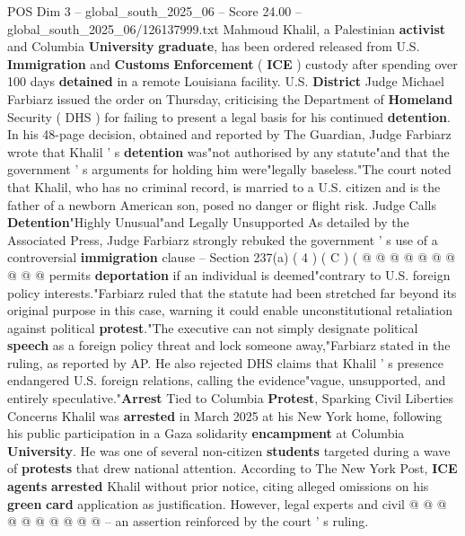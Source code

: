 \begin{textsample}{POS Dim 3 – global\_south\_2025\_06 – Score 24.00 – global\_south\_2025\_06/126137999.txt}  \label{ex:f3_pos_190}
Mahmoud Khalil, a Palestinian \textbf{activist} and Columbia \textbf{University} \textbf{graduate}, has been ordered released from U.S. \textbf{Immigration} and \textbf{Customs} \textbf{Enforcement} ( \textbf{ICE} ) custody after spending over 100 days \textbf{detained} in a remote Louisiana facility.
U.S. \textbf{District} Judge Michael Farbiarz issued the order on Thursday, criticising the Department of \textbf{Homeland} Security ( DHS ) for failing to present a legal basis for his continued \textbf{detention}.
In his 48-page decision, obtained and reported by The Guardian, Judge Farbiarz wrote that Khalil ' s \textbf{detention} was"not authorised by any statute"and that the government ' s arguments for holding him were"legally baseless."The court noted that Khalil, who has no criminal record, is married to a U.S. citizen and is the father of a newborn American son, posed no danger or flight risk.
Judge Calls \textbf{Detention}"Highly Unusual"and Legally Unsupported As detailed by the Associated Press, Judge Farbiarz strongly rebuked the government ' s use of a controversial \textbf{immigration} clause -- Section 237(a) ( 4 ) ( C ) ( @ @ @ @ @ @ @ @ @ @ permits \textbf{deportation} if an individual is deemed"contrary to U.S. foreign policy interests."Farbiarz ruled that the statute had been stretched far beyond its original purpose in this case, warning it could enable unconstitutional retaliation against political \textbf{protest}."The executive can not simply designate political \textbf{speech} as a foreign policy threat and lock someone away,"Farbiarz stated in the ruling, as reported by AP.
He also rejected DHS claims that Khalil ' s presence endangered U.S. foreign relations, calling the evidence"vague, unsupported, and entirely speculative."\textbf{Arrest} Tied to Columbia \textbf{Protest}, Sparking Civil Liberties Concerns Khalil was \textbf{arrested} in March 2025 at his New York home, following his public participation in a Gaza solidarity \textbf{encampment} at Columbia \textbf{University}.
He was one of several non-citizen \textbf{students} targeted during a wave of \textbf{protests} that drew national attention.
According to The New York Post, \textbf{ICE} \textbf{agents} \textbf{arrested} Khalil without prior notice, citing alleged omissions on his \textbf{green} \textbf{card} application as justification.
However, legal experts and civil @ @ @ @ @ @ @ @ @ @ -- an assertion reinforced by the court ' s ruling.

\end{textsample}
